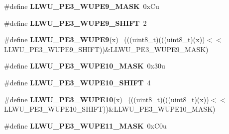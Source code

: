 \begin{DoxyCompactItemize}
\item 
\hypertarget{group___l_l_w_u___register___masks_gad03733955d18194da002aeceedc2edf5}{}\#define {\bfseries L\+L\+W\+U\+\_\+\+P\+E3\+\_\+\+W\+U\+P\+E9\+\_\+\+M\+A\+S\+K}~0x\+Cu\label{group___l_l_w_u___register___masks_gad03733955d18194da002aeceedc2edf5}

\item 
\hypertarget{group___l_l_w_u___register___masks_ga26cad28b7fe4fd2da53ece9d3744016c}{}\#define {\bfseries L\+L\+W\+U\+\_\+\+P\+E3\+\_\+\+W\+U\+P\+E9\+\_\+\+S\+H\+I\+F\+T}~2\label{group___l_l_w_u___register___masks_ga26cad28b7fe4fd2da53ece9d3744016c}

\item 
\hypertarget{group___l_l_w_u___register___masks_gac73074d8d4040f05f97c8738c2617350}{}\#define {\bfseries L\+L\+W\+U\+\_\+\+P\+E3\+\_\+\+W\+U\+P\+E9}(x)                                            ~(((uint8\+\_\+t)(((uint8\+\_\+t)(x))$<$$<$L\+L\+W\+U\+\_\+\+P\+E3\+\_\+\+W\+U\+P\+E9\+\_\+\+S\+H\+I\+F\+T))\&L\+L\+W\+U\+\_\+\+P\+E3\+\_\+\+W\+U\+P\+E9\+\_\+\+M\+A\+S\+K)\label{group___l_l_w_u___register___masks_gac73074d8d4040f05f97c8738c2617350}

\item 
\hypertarget{group___l_l_w_u___register___masks_ga6d8e812233df26a72459712117996efa}{}\#define {\bfseries L\+L\+W\+U\+\_\+\+P\+E3\+\_\+\+W\+U\+P\+E10\+\_\+\+M\+A\+S\+K}~0x30u\label{group___l_l_w_u___register___masks_ga6d8e812233df26a72459712117996efa}

\item 
\hypertarget{group___l_l_w_u___register___masks_ga1686c8515045158eeef3fc0c5df480d9}{}\#define {\bfseries L\+L\+W\+U\+\_\+\+P\+E3\+\_\+\+W\+U\+P\+E10\+\_\+\+S\+H\+I\+F\+T}~4\label{group___l_l_w_u___register___masks_ga1686c8515045158eeef3fc0c5df480d9}

\item 
\hypertarget{group___l_l_w_u___register___masks_ga08307363da95dd3aef24ec6c32a04f81}{}\#define {\bfseries L\+L\+W\+U\+\_\+\+P\+E3\+\_\+\+W\+U\+P\+E10}(x)                                          ~(((uint8\+\_\+t)(((uint8\+\_\+t)(x))$<$$<$L\+L\+W\+U\+\_\+\+P\+E3\+\_\+\+W\+U\+P\+E10\+\_\+\+S\+H\+I\+F\+T))\&L\+L\+W\+U\+\_\+\+P\+E3\+\_\+\+W\+U\+P\+E10\+\_\+\+M\+A\+S\+K)\label{group___l_l_w_u___register___masks_ga08307363da95dd3aef24ec6c32a04f81}

\item 
\hypertarget{group___l_l_w_u___register___masks_gad46cfb926e4e6bbc0cba079fb07a2bfd}{}\#define {\bfseries L\+L\+W\+U\+\_\+\+P\+E3\+\_\+\+W\+U\+P\+E11\+\_\+\+M\+A\+S\+K}~0x\+C0u\label{group___l_l_w_u___register___masks_gad46cfb926e4e6bbc0cba079fb07a2bfd}


\end{DoxyCompactItemize}

